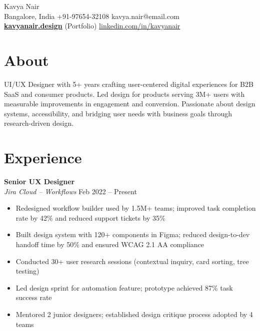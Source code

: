 \documentclass[10.5pt,a4paper]{article}
\begin{document}
\begin{center}
{\fontsize{24}{28}\selectfont\color{accent}Kavya Nair}\\[8pt]
{\small Bangalore, India \quad\textperiodcentered\quad +91-97654-32108 \quad\textperiodcentered\quad kavya.nair@email.com}\\[4pt]
{\small \href{https://kavyanair.design}{\color{accent}\textbf{kavyanair.design}} (Portfolio) \quad\textperiodcentered\quad \href{https://linkedin.com/in/kavyanair}{linkedin.com/in/kavyanair}}
\end{center}

\vspace{10pt}

\section{About}
UI/UX Designer with 5+ years crafting user-centered digital experiences for B2B SaaS and consumer products. Led design for products serving 3M+ users with measurable improvements in engagement and conversion. Passionate about design systems, accessibility, and bridging user needs with business goals through research-driven design.

\vspace{4pt}

\section{Experience}

\textbf{Senior UX Designer} \\[2pt]
\textit{Jira Cloud -- Workflows} \hfill Feb 2022 -- Present
\begin{itemize}
  \item Redesigned workflow builder used by 1.5M+ teams; improved task completion rate by 42\% and reduced support tickets by 35\%
  \item Built design system with 120+ components in Figma; reduced design-to-dev handoff time by 50\% and ensured WCAG 2.1 AA compliance
  \item Conducted 30+ user research sessions (contextual inquiry, card sorting, tree testing)
  \item Led design sprint for automation feature; prototype achieved 87\% task success rate
  \item Mentored 2 junior designers; established design critique process adopted by 4 teams
\end{itemize}
\end{document}
